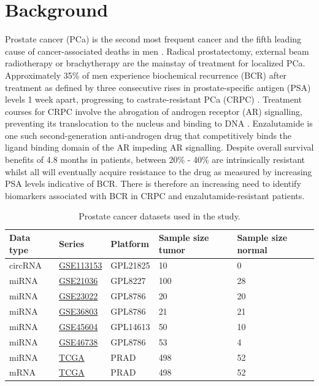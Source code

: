 \documentclass[twocolumn]{bmcart}%
\begin{document}
\section*{Background}
Prostate cancer (PCa) is the second most frequent cancer and the fifth leading cause of cancer-associated deaths in men \cite{Sung2021May}. Radical prostatectomy, external beam radiotherapy or brachytherapy are the mainstay of treatment for localized PCa. Approximately 35\% of men experience biochemical recurrence (BCR) after treatment as defined by three consecutive rises in prostate-specific antigen (PSA) levels 1 week apart, progressing to castrate-resistant PCa (CRPC) \cite{Lim2018Aug}. Treatment courses for CRPC involve the abrogation of androgen receptor (AR) signalling, preventing its translocation to the nucleus and binding to DNA \cite{Cornford2017Apr}. Enzalutamide is one such second-generation anti-androgen drug that competitively binds the ligand binding domain of the AR impeding AR signalling. Despite overall survival benefits of 4.8 months in patients, between 20\% - 40\% are intrinsically resistant whilst all will eventually acquire resistance to the drug as measured by increasing PSA levels \cite{Scher2012Sep, Lim2018Aug} indicative of BCR. There is therefore an increasing need to identify biomarkers associated with BCR in CRPC and enzalutamide-resistant patients. \par

\begin{table}[hbt!]
\caption{Prostate cancer datasets used in the study.}
\begin{tabular}{lllll}
\toprule 
\textbf{Data type} & \textbf{Series} & \textbf{Platform} & \textbf{Sample size tumor} & \textbf{Sample size normal} 
\\
\toprule 
circRNA & \href{https://www.ncbi.nlm.nih.gov/geo/query/acc.cgi?acc=GSE113153}{GSE113153} \cite{Yang2019Apr} & GPL21825 & 10 & 0
\\
miRNA & \href{https://www.ncbi.nlm.nih.gov/geo/query/acc.cgi?acc=GSE21036}{GSE21036} \cite{Taylor2010Jul} & GPL8227 & 100 & 28 
\\ 
miRNA & \href{https://www.ncbi.nlm.nih.gov/geo/query/acc.cgi?acc=GSE23022}{GSE23022} \cite{Wach2012Feb} & GPL8786 & 20 & 20 
\\
miRNA & \href{https://www.ncbi.nlm.nih.gov/geo/query/acc.cgi?acc=GSE36803}{GSE36803} \cite{Lin2013Feb} & GPL8786 & 21 & 21 
\\ 
miRNA & \href{https://www.ncbi.nlm.nih.gov/geo/query/acc.cgi?acc=GSE45604}{GSE45604} \cite{Casanova-Salas2014Jul} & GPL14613 & 50 & 10 
\\ 
miRNA & \href{https://www.ncbi.nlm.nih.gov/geo/query/acc.cgi?acc=GSE46738}{GSE46738} \cite{Leite2015Jan} & GPL8786 & 53 & 4 
\\ 
miRNA & \href{https://portal.gdc.cancer.gov/repository}{TCGA} \cite{Grossman2016Sep} & PRAD & 498 & 52 
\\
mRNA & \href{https://portal.gdc.cancer.gov/repository}{TCGA} \cite{Grossman2016Sep} & PRAD & 498 & 52
\\
\toprule
\end{tabular}
\label{tab:pca_datasets}
\end{table}
\end{document}
